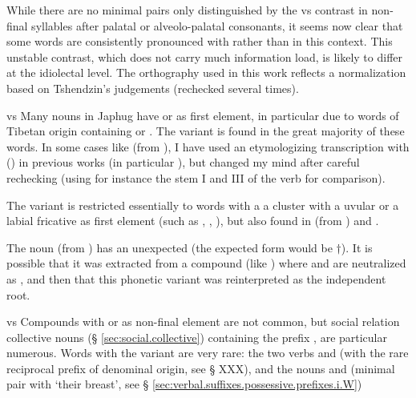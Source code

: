 While there are no minimal pairs only distinguished by the  vs  contrast in non-final syllables after palatal or alveolo-palatal consonants, it seems now clear that some words are consistently pronounced with  rather than  in this context. This unstable contrast, which does not carry much information load, is likely to differ at the idiolectal level. The orthography used in this work reflects a normalization based on Tshendzin's judgements (rechecked several times).
\begin{paragraph}{ vs }
Many nouns in Japhug have  or  as first element, in particular due to words of Tibetan origin containing  or . The variant   is found in the great majority of these words. In some cases like  (from ), I have used an etymologizing transcription with  () in previous works (in particular \citealt{jacques15japhug}), but changed my mind after careful rechecking (using for instance the stem I and III of the verb  for comparison). 

The variant  is restricted essentially to words with a a cluster with a uvular or a labial fricative as first element (such as , , ), but also found in  (from ) and .

The noun  (from ) has an unexpected  (the expected form would be $\dagger$). It is possible that it was extracted from a compound (like ) where  and  are neutralized as , and then that this phonetic variant was reinterpreted as the independent root.
\end{paragraph}
\begin{paragraph}{ vs  } \label{sec:compounds.ndZi.ndZW}
Compounds with  or  as non-final element are not common, but social relation collective nouns (§ \ref{sec:social.collective}) containing the prefix , are particular numerous. Words with the variant  are very rare: the two verbs  and  (with the rare reciprocal prefix  of denominal origin, see § XXX), and the nouns  and  (minimal pair with  `their breast', see § \ref{sec:verbal.suffixes.possessive.prefixes.i.W})
\end{paragraph}
